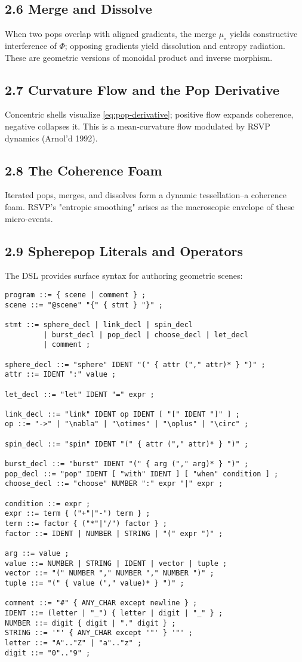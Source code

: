 \documentclass[12pt,a4paper]{article}
\DeclareMathOperator*{\SPC}{SPC}
\newcommand{\muo}{\mu_{\circ}}
\theoremstyle{definition}
\theoremstyle{plain}
\begin{document}
\subsection*{2.6 Merge and Dissolve}
When two pops overlap with aligned gradients, the merge $\muo$ yields constructive interference of $\Phi$; opposing gradients yield dissolution and entropy radiation. These are geometric versions of monoidal product and inverse morphism.

\subsection*{2.7 Curvature Flow and the Pop Derivative}
Concentric shells visualize \eqref{eq:pop-derivative}; positive flow expands coherence, negative collapses it. This is a mean-curvature flow modulated by RSVP dynamics (Arnol'd 1992).

\subsection*{2.8 The Coherence Foam}
Iterated pops, merges, and dissolves form a dynamic tessellation--a coherence foam. RSVP's "entropic smoothing" arises as the macroscopic envelope of these micro-events.

\subsection*{2.9 Spherepop Literals and Operators}
The \SPC{} DSL provides surface syntax for authoring geometric scenes:

\begin{verbatim}
program ::= { scene | comment } ;
scene ::= "@scene" "{" { stmt } "}" ;

stmt ::= sphere_decl | link_decl | spin_decl
         | burst_decl | pop_decl | choose_decl | let_decl
         | comment ;

sphere_decl ::= "sphere" IDENT "(" { attr ("," attr)* } ")" ;
attr ::= IDENT ":" value ;

let_decl ::= "let" IDENT "=" expr ;

link_decl ::= "link" IDENT op IDENT [ "[" IDENT "]" ] ;
op ::= "->" | "\nabla" | "\otimes" | "\oplus" | "\circ" ;

spin_decl ::= "spin" IDENT "(" { attr ("," attr)* } ")" ;

burst_decl ::= "burst" IDENT "(" { arg ("," arg)* } ")" ;
pop_decl ::= "pop" IDENT [ "with" IDENT ] [ "when" condition ] ;
choose_decl ::= "choose" NUMBER ":" expr "|" expr ;

condition ::= expr ;
expr ::= term { ("+"|"-") term } ;
term ::= factor { ("*"|"/") factor } ;
factor ::= IDENT | NUMBER | STRING | "(" expr ")" ;

arg ::= value ;
value ::= NUMBER | STRING | IDENT | vector | tuple ;
vector ::= "(" NUMBER "," NUMBER "," NUMBER ")" ;
tuple ::= "(" { value ("," value)* } ")" ;

comment ::= "#" { ANY_CHAR except newline } ;
IDENT ::= (letter | "_") { letter | digit | "_" } ;
NUMBER ::= digit { digit | "." digit } ;
STRING ::= '"' { ANY_CHAR except '"' } '"' ;
letter ::= "A".."Z" | "a".."z" ;
digit ::= "0".."9" ;
\end{verbatim}
\end{document}
